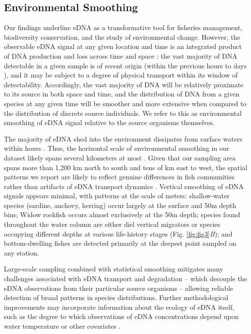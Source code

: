 \documentclass{article}
\begin{document}
\subsection*{Environmental Smoothing}
Our findings underline eDNA as a transformative tool for fisheries management, biodiversity conservation, and the study of environmental change. However, the observable eDNA signal at any given location and time is an integrated product of DNA production and loss across time and space \cite{gold2023}: the vast majority of DNA detectable in a given sample is of recent origin (within the previous hours to days \cite{strickler2015,collins2018,machler2018}), and it may be subject to a degree of physical transport within its window of detectability. Accordingly, the vast majority of DNA will be relatively proximate to its source in both space and time, and the distribution of DNA from a given species at any given time will be smoother and more extensive when compared to the distribution of discrete source individuals. We refer to this as environmental smoothing of eDNA signal relative to the source organisms themselves. 

The majority of eDNA shed into the environment dissipates from surface waters within hours \cite{andruszkiewiczallan2021}. Thus, the horizontal scale of environmental smoothing in our dataset likely spans several kilometers at most \cite{baetscher2024}. Given that our sampling area spans more than 1,200 km north to south and tens of km east to west, the spatial patterns we report are likely to reflect genuine differences in fish communities rather than artifacts of eDNA transport dynamics \cite{guri2023}. Vertical smoothing of eDNA signals appears minimal, with patterns at the scale of meters: shallow-water species (sardine, anchovy, herring) occur largely at the surface and 50m depth bins; Widow rockfish occurs almost exclusively at the 50m depth; species found throughout the water column are either diel vertical migrators or species occupying different depths at various life-history stages (Fig. \ref{fig:fig3}\textit{B}); and bottom-dwelling fishes are detected primarily at the deepest point sampled on any station. 

Large-scale sampling combined with statistical smoothing mitigates many challenges associated with eDNA transport and degradation -- which decouple the eDNA observations from their particular source organisms -- allowing reliable detection of broad patterns in species distributions. Further methodological improvements may incorporate information about the ecology of eDNA itself, such as the degree to which observations of eDNA concentrations depend upon water temperature or other covariates \cite{jo2019b}. 
\end{document}
